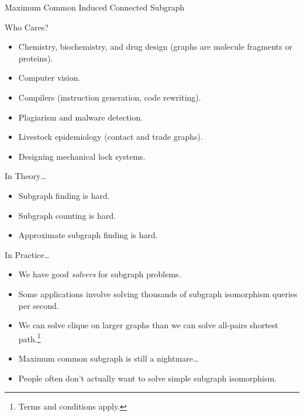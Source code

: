 \documentclass[aspectratio=169,compress,10pt]{beamer}
\begin{document}
\begin{frame}{Maximum Common Induced Connected Subgraph}
\end{frame}

\begin{frame}{Who Cares?}
    \begin{itemize}
        \item Chemistry, biochemistry, and drug design (graphs are molecule fragments or proteins).
        \item Computer vision.
        \item Compilers (instruction generation, code rewriting).
        \item Plagiarism and malware detection.
        \item Livestock epidemiology (contact and trade graphs).
        \item Designing mechanical lock systems.
    \end{itemize}
\end{frame}

\begin{frame}{In Theory\ldots}
    \begin{itemize}
        \item Subgraph finding is hard.
        \item Subgraph counting is hard.
        \item Approximate subgraph finding is hard.
    \end{itemize}
\end{frame}

\begin{frame}{In Practice\ldots}
    \begin{itemize}
        \item We have good \emph{solvers} for subgraph problems.
        \item Some applications involve solving thousands of subgraph isomorphism queries per second.
        \item We can solve clique on larger graphs than we can solve all-pairs
            shortest path.\footnote{Terms and conditions apply.}
        \item<2-> Maximum common subgraph is still a nightmare\ldots
        \item<3-> People often don't actually want to solve simple subgraph isomorphism.
    \end{itemize}
\end{frame}
\end{document}
